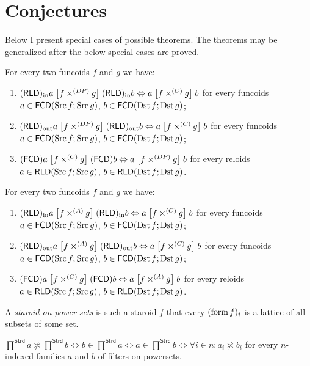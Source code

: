 \section{Conjectures}
\begin{rem}
Below I present special cases of possible theorems. The theorems may
be generalized after the below special cases are proved.\end{rem}
\begin{conjecture}
For every two funcoids $f$ and $g$ we have:
\begin{enumerate}
\item $(\mathsf{RLD})_{\mathrm{in}} a\mathrel{\left[f\times^{(DP)}g\right]}(\mathsf{RLD})_{\mathrm{in}} b\Leftrightarrow a\mathrel{\left[f\times^{(C)}g\right]}b$
for every funcoids $a\in\mathsf{FCD}(\operatorname{Src} f;\operatorname{Src} g)$, $b\in\mathsf{FCD}(\operatorname{Dst} f;\operatorname{Dst} g)$;
\item $(\mathsf{RLD})_{\mathrm{out}} a\mathrel{\left[f\times^{(DP)}g\right]}(\mathsf{RLD})_{\mathrm{out}} b\Leftrightarrow a\mathrel{\left[f\times^{(C)}g\right]}b$
for every funcoids $a\in\mathsf{FCD}(\operatorname{Src} f;\operatorname{Src} g)$, $b\in\mathsf{FCD}(\operatorname{Dst} f;\operatorname{Dst} g)$;
\item $(\mathsf{FCD}) a\mathrel{\left[f\times^{(C)}g\right]}(\mathsf{FCD}) b\Leftrightarrow a\mathrel{\left[f\times^{(DP)}g\right]}b$
for every reloids $a\in\mathsf{RLD}(\operatorname{Src} f;\operatorname{Src} g)$, $b\in\mathsf{RLD}(\operatorname{Dst} f;\operatorname{Dst} g)$.
\end{enumerate}
\end{conjecture}

\begin{conjecture}
For every two funcoids $f$ and $g$ we have:
\begin{enumerate}
\item $(\mathsf{RLD})_{\mathrm{in}} a\mathrel{\left[f\times^{(A)}g\right]}(\mathsf{RLD})_{\mathrm{in}} b\Leftrightarrow a\mathrel{\left[f\times^{(C)}g\right]}b$
for every funcoids $a\in\mathsf{FCD}(\operatorname{Src} f;\operatorname{Src} g)$, $b\in\mathsf{FCD}(\operatorname{Dst} f;\operatorname{Dst} g)$;
\item $(\mathsf{RLD})_{\mathrm{out}} a\mathrel{\left[f\times^{(A)}g\right]}(\mathsf{RLD})_{\mathrm{out}} b\Leftrightarrow a\mathrel{\left[f\times^{(C)}g\right]}b$
for every funcoids $a\in\mathsf{FCD}(\operatorname{Src} f;\operatorname{Src} g)$, $b\in\mathsf{FCD}(\operatorname{Dst} f;\operatorname{Dst} g)$;
\item $(\mathsf{FCD}) a\mathrel{\left[f\times^{(C)}g\right]}(\mathsf{FCD}) b\Leftrightarrow a\mathrel{\left[f\times^{(A)}g\right]}b$
for every reloids $a\in\mathsf{RLD}(\operatorname{Src} f;\operatorname{Src} g)$, $b\in\mathsf{RLD}(\operatorname{Dst} f;\operatorname{Dst} g)$.
\end{enumerate}
\end{conjecture}
\begin{defn}
A \emph{staroid on power sets} is such a staroid $f$ that every $(\operatorname{form} f)_{i}$
is a lattice of all subsets of some set.\end{defn}
\begin{conjecture}
\label{conj-meet-two-prod}$\prod^{\mathsf{Strd}}a\nasymp\prod^{\mathsf{Strd}}b\Leftrightarrow b\in\prod^{\mathsf{Strd}}a\Leftrightarrow a\in\prod^{\mathsf{Strd}}b\Leftrightarrow\forall i\in n:a_{i}\nasymp b_{i}$
for every $n$-indexed families $a$ and $b$ of filters on powersets.
\end{conjecture}

